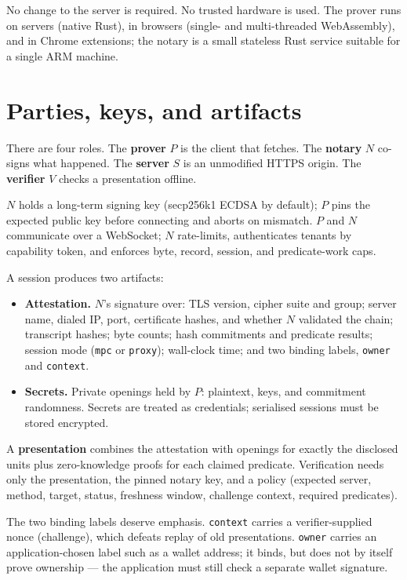 \documentclass[11pt,a4paper]{article}
\begin{document}
No change to the server is required. No trusted hardware is used.
The prover runs on servers (native Rust), in browsers (single- and
multi-threaded WebAssembly), and in Chrome extensions; the notary is a small
stateless Rust service suitable for a single ARM machine.

\section{Parties, keys, and artifacts}

There are four roles. The \textbf{prover} $P$ is the client that fetches.
The \textbf{notary} $N$ co-signs what happened. The \textbf{server} $S$ is an
unmodified HTTPS origin. The \textbf{verifier} $V$ checks a presentation offline.

$N$ holds a long-term signing key (secp256k1 ECDSA by default); $P$ pins the
expected public key before connecting and aborts on mismatch.
$P$ and $N$ communicate over a WebSocket; $N$ rate-limits, authenticates
tenants by capability token, and enforces byte, record, session, and
predicate-work caps.

A session produces two artifacts:

\begin{itemize}[leftmargin=2em]
\item \textbf{Attestation.} $N$'s signature over: TLS version, cipher suite and
group; server name, dialed IP, port, certificate hashes, and whether $N$
validated the chain; transcript hashes; byte counts; hash commitments and
predicate results; session mode (\texttt{mpc} or \texttt{proxy}); wall-clock
time; and two binding labels, \texttt{owner} and \texttt{context}.
\item \textbf{Secrets.} Private openings held by $P$: plaintext, keys, and
commitment randomness. Secrets are treated as credentials; serialised sessions
must be stored encrypted.
\end{itemize}

A \textbf{presentation} combines the attestation with openings for exactly the
disclosed units plus zero-knowledge proofs for each claimed predicate.
Verification needs only the presentation, the pinned notary key, and a policy
(expected server, method, target, status, freshness window, challenge context,
required predicates).

The two binding labels deserve emphasis.
\texttt{context} carries a verifier-supplied nonce (challenge), which defeats
replay of old presentations.
\texttt{owner} carries an application-chosen label such as a wallet address;
it binds, but does not by itself prove ownership --- the application must still
check a separate wallet signature.
\end{document}

